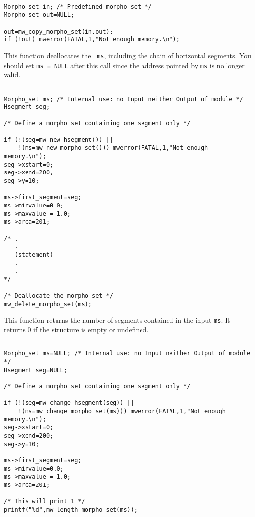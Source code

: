\Next
\Example
\begin{verbatim}

Morpho_set in; /* Predefined morpho_set */
Morpho_set out=NULL; 

out=mw_copy_morpho_set(in,out);
if (!out) mwerror(FATAL,1,"Not enough memory.\n");
\end{verbatim}

\newpage %


\Description
This function deallocates the \mset\ \verb+ms+, including the
chain of horizontal segments.
You should set \verb+ms = NULL+ after this call since the address pointed
by \verb+ms+ is no longer valid.

\Next
\Example
\begin{verbatim}

Morpho_set ms; /* Internal use: no Input neither Output of module */
Hsegment seg;

/* Define a morpho set containing one segment only */

if (!(seg=mw_new_hsegment()) ||
    !(ms=mw_new_morpho_set())) mwerror(FATAL,1,"Not enough memory.\n");
seg->xstart=0; 
seg->xend=200;
seg->y=10;

ms->first_segment=seg;
ms->minvalue=0.0;
ms->maxvalue = 1.0;
ms->area=201;

/* .
   .
   (statement)
   .
   .
*/

/* Deallocate the morpho_set */
mw_delete_morpho_set(ms);

\end{verbatim}

\newpage %


\Description
This function returns the number of segments contained in the input
\verb+ms+.
It returns $0$ if the structure is empty or undefined.

\Next
\Example
\begin{verbatim}

Morpho_set ms=NULL; /* Internal use: no Input neither Output of module */
Hsegment seg=NULL;

/* Define a morpho set containing one segment only */

if (!(seg=mw_change_hsegment(seg)) ||
    !(ms=mw_change_morpho_set(ms))) mwerror(FATAL,1,"Not enough memory.\n");
seg->xstart=0; 
seg->xend=200;
seg->y=10;

ms->first_segment=seg;
ms->minvalue=0.0;
ms->maxvalue = 1.0;
ms->area=201;

/* This will print 1 */
printf("%d",mw_length_morpho_set(ms));
\end{verbatim}

